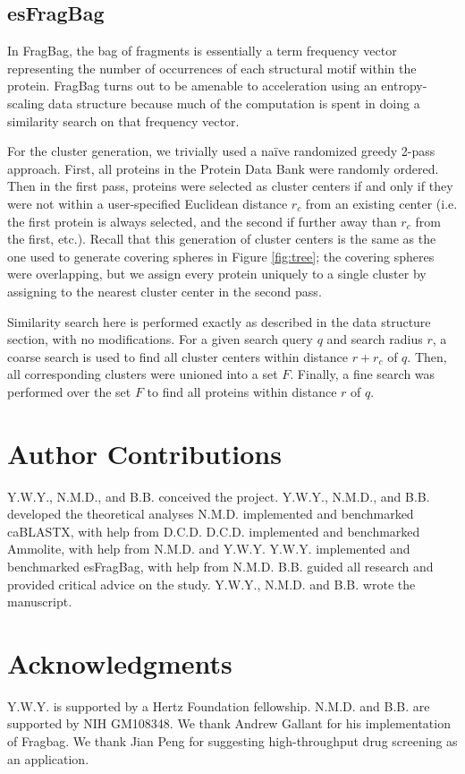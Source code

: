 \documentclass[review,preprint,12pt]{elsarticle}
\theoremstyle{definition}
\theoremstyle{remark}
\numberwithin{equation}{section}
\begin{document}
\subsection{esFragBag}
In FragBag, the bag of fragments is essentially
a term frequency vector representing the number of occurrences of each structural motif within the protein.
FragBag turns out to be amenable to acceleration using an entropy-scaling data structure because much of the computation is spent in doing a similarity search on that frequency vector.

For the cluster generation, we trivially used a na\"ive randomized greedy 2-pass approach.
First, all proteins in the Protein Data Bank were randomly ordered.
Then in the first pass, proteins were selected as cluster centers if and only if they were not within a user-specified Euclidean distance $r_c$ from an existing center (i.e. the first protein is always selected, and the second if further away than $r_c$ from the first, etc.).
Recall that this generation of cluster centers is the same as the one used to generate covering spheres in Figure \ref{fig:tree};
the covering spheres were overlapping, but we assign every protein uniquely to a single cluster by assigning to the nearest cluster center in the second pass.

Similarity search here is performed exactly as described in the data structure section, with no modifications.
For a given search query $q$ and search radius $r$,
a coarse search is used to find all cluster centers within distance $r+r_c$ of $q$.
Then, all corresponding clusters were unioned into a set $F$.
Finally, a fine search was performed over the set $F$ to find all proteins within distance $r$ of $q$.

\section{Author Contributions}
Y.W.Y., N.M.D., and B.B. conceived the project.
Y.W.Y., N.M.D., and B.B. developed the theoretical analyses
N.M.D. implemented and benchmarked caBLASTX, with help from D.C.D.
D.C.D. implemented and benchmarked Ammolite, with help from N.M.D. and Y.W.Y.
Y.W.Y. implemented and benchmarked esFragBag, with help from N.M.D.
B.B. guided all research and provided critical advice on the study.
Y.W.Y., N.M.D. and B.B. wrote the manuscript.

\section{Acknowledgments}
Y.W.Y. is supported by a Hertz Foundation fellowship.
N.M.D. and B.B. are supported by NIH GM108348.
We thank Andrew Gallant for his implementation of Fragbag.
We thank Jian Peng for suggesting high-throughput drug screening as an application.


%

\end{document}
